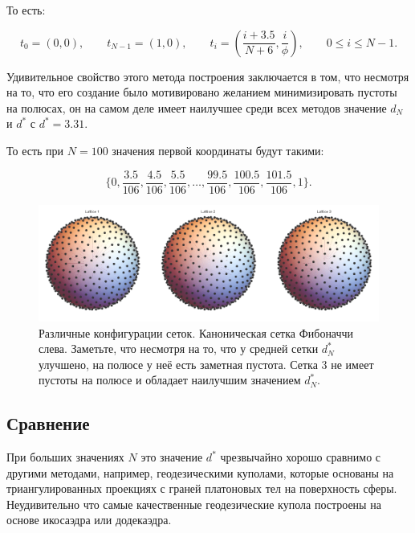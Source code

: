 \documentclass[12pt, a4paper]{article}
\begin{document}
То есть:

\begin{displaymath}
	t_0 = (0, 0),
	\qquad
	t_{N-1} = (1, 0),
	\qquad
	t_i = \left( \frac{i + 3.5}{N + 6}, \frac{i}{\phi} \right),
	\qquad
	0 \leq i \leq N-1.
	\tag{3}
\end{displaymath}

Удивительное свойство этого метода построения заключается в том, что несмотря на то, что его создание было мотивировано желанием минимизировать пустоты на полюсах, он на самом деле имеет наилучшее среди всех методов значение $d_N$ и $d^*$ с $d^* = 3.31$.

То есть при $N=100$ значения первой координаты будут такими:

\begin{displaymath}
	\{
		0,
		\frac{3.5}{106},
		\frac{4.5}{106},
		\frac{5.5}{106},
		\ldots,
		\frac{99.5}{106},
		\frac{100.5}{106},
		\frac{101.5}{106},
		1
	\}.
\end{displaymath}

\begin{figure}[H]
    \centering
    \includegraphics[width=\textwidth]{images/3.png}
    \caption{Различные конфигурации сеток. Каноническая сетка Фибоначчи слева. Заметьте, что несмотря на то, что у средней сетки $d_N^*$ улучшено, на полюсе у неё есть заметная пустота. Сетка 3 не имеет пустоты на полюсе и обладает наилучшим значением $d_N^*$.}
\end{figure}

\subsection{Сравнение}

При больших значениях $N$ это значение $d^*$ чрезвычайно хорошо сравнимо с другими методами, например, геодезическими куполами, которые основаны на триангулированных проекциях с граней платоновых тел на поверхность сферы. Неудивительно что самые качественные геодезические купола построены на основе икосаэдра или додекаэдра.
\end{document}
